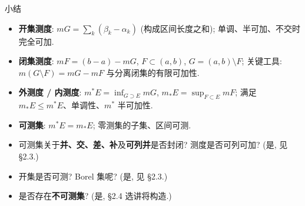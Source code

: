 \begin{frame}{小结}

\begin{itemize}
\item \textbf{开集测度}: $m G = \sum_k (\beta_k - \alpha_k)$ (构成区间长度之和); 单调、半可加、不交时完全可加.
\item \textbf{闭集测度}: $m F = (b - a) - m G$, $F \subset (a,b)$, $G = (a,b) \setminus F$; 关键工具: $m(G \setminus F) = m G - m F$ 与分离闭集的有限可加性.
\item \textbf{外测度 / 内测度}: $m^* E = \inf_{G \supset E} m G$, $m_* E = \sup_{F \subset E} m F$; 满足 $m_* E \leqslant m^* E$、单调性、$m^*$ 半可加性.
\item \textbf{可测集}: $m^* E = m_* E$; 零测集的子集、区间可测.
\end{itemize}

\pause

\begin{question}
\begin{itemize}
\item 可测集关于\textbf{并、交、差、补}及\textbf{可列并}是否封闭? 测度是否可列可加? (是, 见 §2.3.)
\item 开集是否可测? Borel 集呢? (是, 见 §2.3.)
\item 是否存在\textbf{不可测集}? (是, \S 2.4 选讲将构造.)
\end{itemize}
\end{question}

\end{frame}





